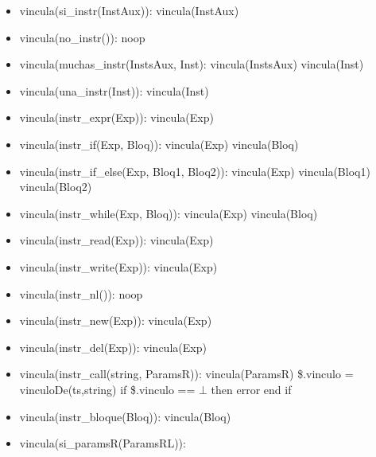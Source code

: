 \documentclass[11pt]{article}
\begin{document}
            \begin{itemize}
                \item vincula(si\_instr(InstAux)): 
                    \subitem vincula(InstAux)
                \item vincula(no\_instr()): 
                    \subitem noop
                \item vincula(muchas\_instr(InstsAux, Inst): 
                    \subitem vincula(InstsAux) 
                    \subitem vincula(Inst)
                \item vincula(una\_instr(Inst)): 
                    \subitem vincula(Inst)
                \item vincula(instr\_expr(Exp)): 
                    \subitem vincula(Exp)
                \item vincula(instr\_if(Exp, Bloq)): 
                    \subitem vincula(Exp) 
                    \subitem vincula(Bloq)
                \item vincula(instr\_if\_else(Exp, Bloq1, Bloq2)): 
                    \subitem vincula(Exp) 
                    \subitem vincula(Bloq1) 
                    \subitem vincula(Bloq2)
                \item vincula(instr\_while(Exp, Bloq)): 
                    \subitem vincula(Exp) 
                    \subitem vincula(Bloq)
                \item vincula(instr\_read(Exp)): 
                    \subitem vincula(Exp)
                \item vincula(instr\_write(Exp)): 
                    \subitem vincula(Exp)
                \item vincula(instr\_nl()): 
                    \subitem noop
                \item vincula(instr\_new(Exp)): 
                    \subitem vincula(Exp)
                \item vincula(instr\_del(Exp)): 
                    \subitem vincula(Exp)
                \item vincula(instr\_call(string, ParamsR)): 
                    \subitem vincula(ParamsR) 
                    \subitem \$.vinculo = vinculoDe(ts,string) 
                    \subitem if \$.vinculo == $\bot$ then 
                        \subsubitem error 
                    \subitem end if
                \item vincula(instr\_bloque(Bloq)): 
                    \subitem vincula(Bloq)
                \item vincula(si\_paramsR(ParamsRL)): 

\end{itemize}
\end{document}

